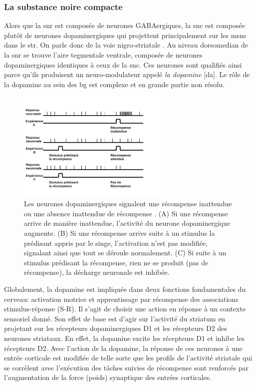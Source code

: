 \subsubsection{La substance noire compacte}

Alors que la \gls{snr} est composée de neurones GABAergiques, la \gls{snc} est composée plutôt de neurones dopaminergiques qui projettent principalement sur les \glspl{msn} dans le \gls{str}. On parle donc de la voie nigro-striatale \cite{Haber:2000}. Au niveau dorsomedian de la \gls{snr} se trouve l'aire tegmentale ventrale, compos\'ee de neurones dopaminergiques identiques à ceux de la \gls{snc}. Ces neurones sont qualifiés ainsi parce qu'ils produisent un neuro-modulateur appelé \textit{la dopamine} [\gls{da}]. Le rôle de la dopamine au sein des \gls{bg} est complexe et en grande partie non résolu. \\

\begin{figure}
  \begin{center}
    \includegraphics[width=0.65\textwidth]{figures/ch4_2_dopamine}
  \end{center}
  \caption { Les neurones dopaminergiques signalent une récompense inattendue ou une absence inattendue de récompense \protect\cite{Schultz:1997}. (A) Si une récompense arrive de manière inattendue, l'activité du neurone dopaminergique augmente. (B) Si une récompense arrive suite à un stimulus la prédisant appris par le singe, l'activation n'est pas modifiée, signalant ainsi que tout se déroule normalement. (C) Si suite à un stimulus prédisant la récompense, rien ne se produit (pas de récompense), la décharge neuronale est inhibée.}
  \label{dopamine}
\end{figure}

Globalement, la dopamine est impliquée dans deux fonctions fondamentales du cerveau: activation motrice et apprentissage par récompense des associations stimulus-réponse (S-R). Il s'agit de choisir une action en réponse à un contexte sensoriel donné. Son effet de base est d'agir sur l'activité du striatum en projetant sur les récepteurs dopaminergiques D1 et les récepteurs D2 des neurones striataux. En effet, la dopamine excite les récepteurs D1 et inhibe les récepteurs D2. Avec l'action de la dopamine, la réponse de ces neurones à une entrée corticale est modifiée de telle sorte que les profils de l'activité striatale qui se corrèlent avec l'exécution des tâches suivies de récompense sont renforcés par l'augmentation de la force (poids) synaptique des entrées corticales.\\

